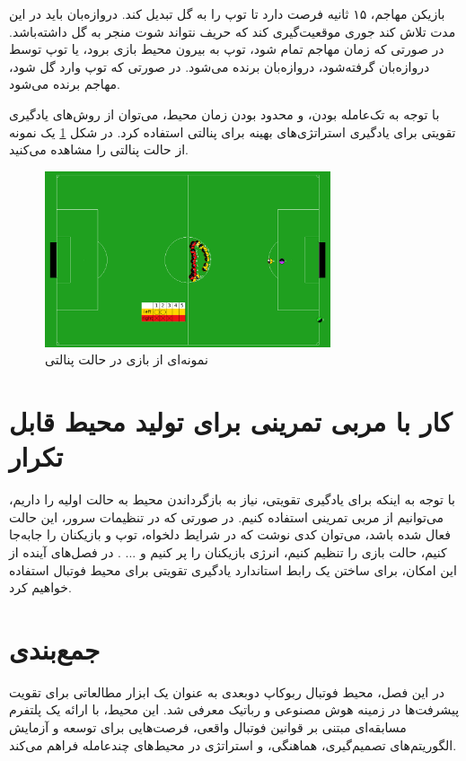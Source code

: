 بازیکن مهاجم، ۱۵ ثانیه فرصت دارد تا توپ را به گل تبدیل کند. دروازه‌بان باید در این مدت تلاش کند جوری موقعیت‌گیری کند که حریف نتواند شوت منجر به گل داشته‌باشد.
در صورتی که زمان مهاجم تمام شود، توپ به بیرون محیط بازی برود، یا توپ توسط دروازه‌بان گرفته‌شود، دروازه‌بان برنده می‌شود. در صورتی که توپ وارد گل شود، مهاجم برنده می‌شود.

با توجه به تک‌عامله بودن، و محدود بودن زمان محیط، می‌توان از روش‌های یادگیری تقویتی برای یادگیری استراتژی‌های بهینه برای پنالتی استفاده کرد.
در شکل
\ref{fig:penalty_demo}
 یک نمونه از حالت پنالتی را مشاهده می‌کنید.
\begin{figure}[H]
\centering
\includegraphics[width=0.75\textwidth]{images/penalty.png}
\caption{نمونه‌ای از بازی در حالت پنالتی}\label{fig:penalty_demo}
\end{figure}
\section{کار با مربی تمرینی برای تولید محیط‌ قابل تکرار}
با توجه به اینکه برای یادگیری تقویتی، نیاز به بازگرداندن محیط به حالت اولیه را داریم، می‌توانیم از 
مربی تمرینی
استفاده کنیم.
در صورتی که در تنظیمات سرور، این حالت فعال شده باشد، می‌توان کدی نوشت که در شرایط دلخواه، توپ و بازیکنان را جا‌به‌جا کنیم،
حالت بازی را تنظیم کنیم، انرژی بازیکنان را پر کنیم‌ و ... .
در فصل‌های آینده از این امکان، برای ساختن یک رابط استاندارد یادگیری تقویتی برای محیط فوتبال استفاده خواهیم کرد.
\section{جمع‌بندی}
در این فصل، محیط فوتبال ربوکاپ دوبعدی به عنوان یک ابزار مطالعاتی برای تقویت پیشرفت‌ها در زمینه هوش مصنوعی و رباتیک معرفی شد.
این محیط، با ارائه یک پلتفرم مسابقه‌ای مبتنی بر قوانین فوتبال واقعی، فرصت‌هایی برای توسعه و آزمایش الگوریتم‌های تصمیم‌گیری، هماهنگی، و استراتژی در محیط‌های چندعامله فراهم می‌کند.

